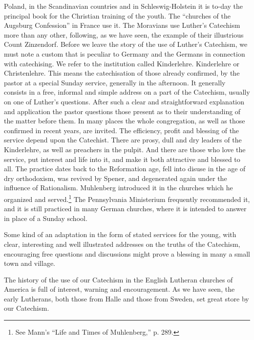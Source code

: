 Poland, in the Scandinavian countries and in Schleswig-Holstein it is to-day the principal book for the Christian training of the youth. The “churches of the Augsburg Confession” in France use it. The Moravians use Luther’s Catechism more than any other, following, as we have seen, the example of their illustrious Count Zinzendorf. Before we leave the story of the use of Luther’s Catechism, we must note a custom that is peculiar to Germany and the Germans in connection with catechising.  We refer to the institution called Kinderlehre. Kinderlehre or Christenlehre. This means the catechisation of those already confirmed, by the pastor at a special Sunday service, generally in the afternoon. It generally consists in a free, informal and simple address on a part of the Catechism, usually on one of Luther’s questions. After such a clear and straightforward explanation and application the pastor questions those present as to their understanding of the matter before them. In many places the whole congregation, as well as those confirmed in recent years, are invited. The efficiency, profit and blessing of the service depend upon the Catechist. There are prosy, dull and dry leaders of the Kinderlehre, as well as preachers in the pulpit. And there are those who love the service, put interest and life into it, and make it both attractive and blessed to all. The practice dates back to the
Reformation age, fell into disuse in the age of dry orthodoxism, was revived by Spener, and degenerated again under the influence of Rationalism. Muhlenberg introduced it in the churches which he organized and served.\footnote{See Mann’s “Life and Times of Muhlenberg,” p. 289.} The Pennsylvania Ministerium frequently recommended it, and it is still practiced in many German churches, where it is intended to answer in place of a Sunday school.

Some kind of an adaptation in the form of stated services for the young, with clear, interesting and well illustrated addresses on the truths of the Catechism, encouraging free questions and discussions might prove a blessing in many a small town and village.

 The history of the use of our Catechism in the English Lutheran churches of America is full of interest, warning and encouragement. As we have seen, the early Lutherans, both those from Halle and those from Sweden, set great store by our Catechism.

